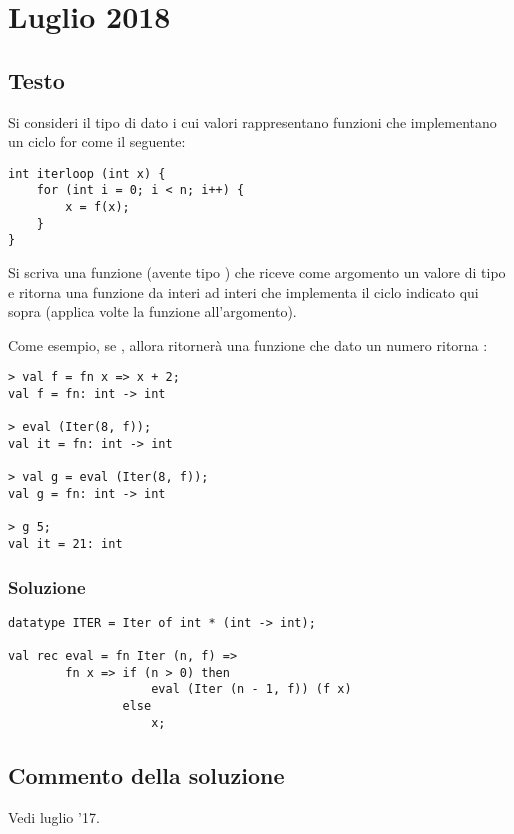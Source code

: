 \section{Luglio 2018}
\subsection{Testo}

Si consideri il tipo di dato  i cui valori  rappresentano funzioni che implementano un ciclo for come il seguente:

\begin{lstlisting}
int iterloop (int x) {
	for (int i = 0; i < n; i++) {
		x = f(x);
	}
}
\end{lstlisting}

Si scriva una funzione  (avente tipo ) che riceve come argomento un valore di tipo  e ritorna una funzione da interi ad interi che implementa il ciclo indicato qui sopra (applica  volte la funzione  all'argomento).

\medskip
Come esempio, se , allora  ritornerà una funzione che dato un numero  ritorna :

\begin{lstlisting}[style = SML]
> val f = fn x => x + 2;
val f = fn: int -> int

> eval (Iter(8, f));
val it = fn: int -> int

> val g = eval (Iter(8, f));
val g = fn: int -> int

> g 5;
val it = 21: int
\end{lstlisting}

\subsubsection{Soluzione}

\begin{lstlisting}[style = SML, caption = {definizione della funzione \sml{eval}}]
datatype ITER = Iter of int * (int -> int);

val rec eval = fn Iter (n, f) =>
		fn x => if (n > 0) then
					eval (Iter (n - 1, f)) (f x)
				else
					x;
\end{lstlisting}

\subsection{Commento della soluzione}

Vedi luglio '17.
